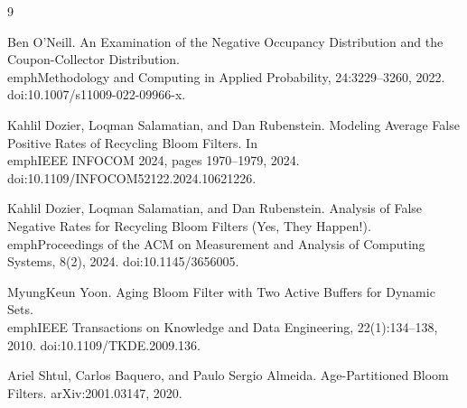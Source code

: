 \documentclass[11pt]{article}
\begin{document}
\begin{thebibliography}{9}

Ben O'Neill.
\newblock An Examination of the Negative Occupancy Distribution and the Coupon-Collector Distribution.
\newblock \\emph{Methodology and Computing in Applied Probability}, 24:3229--3260, 2022.
\newblock doi:10.1007/s11009-022-09966-x.

Kahlil Dozier, Loqman Salamatian, and Dan Rubenstein.
\newblock Modeling Average False Positive Rates of Recycling Bloom Filters.
\newblock In \\emph{IEEE INFOCOM 2024}, pages 1970--1979, 2024.
\newblock doi:10.1109/INFOCOM52122.2024.10621226.

Kahlil Dozier, Loqman Salamatian, and Dan Rubenstein.
\newblock Analysis of False Negative Rates for Recycling Bloom Filters (Yes, They Happen!).
\newblock \\emph{Proceedings of the ACM on Measurement and Analysis of Computing Systems}, 8(2), 2024.
\newblock doi:10.1145/3656005.

MyungKeun Yoon.
\newblock Aging Bloom Filter with Two Active Buffers for Dynamic Sets.
\newblock \\emph{IEEE Transactions on Knowledge and Data Engineering}, 22(1):134--138, 2010.
\newblock doi:10.1109/TKDE.2009.136.

Ariel Shtul, Carlos Baquero, and Paulo Sergio Almeida.
\newblock Age-Partitioned Bloom Filters.
\newblock arXiv:2001.03147, 2020.

\end{thebibliography}
\end{document}
